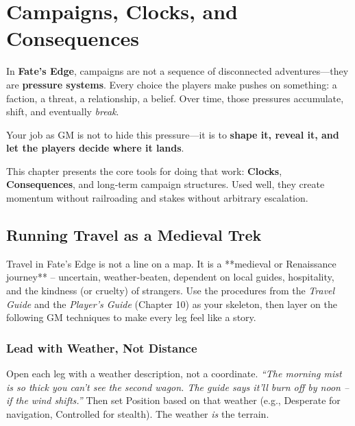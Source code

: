 \chapter{Campaigns, Clocks, and Consequences}
\label{ch:campaigns-clocks}

In \textbf{Fate's Edge}, campaigns are not a sequence of disconnected adventures—they are \textbf{pressure systems}.  
Every choice the players make pushes on something: a faction, a threat, a relationship, a belief. Over time, those pressures accumulate, shift, and eventually \emph{break}.

Your job as GM is not to hide this pressure—it is to \textbf{shape it, reveal it, and let the players decide where it lands}.

This chapter presents the core tools for doing that work: \textbf{Clocks}, \textbf{Consequences}, and long‑term campaign structures. Used well, they create momentum without railroading and stakes without arbitrary escalation.

\section{Running Travel as a Medieval Trek}
\label{sec:gm-travel}

Travel in Fate’s Edge is not a line on a map. It is a **medieval or Renaissance journey** – uncertain, weather‑beaten, dependent on local guides, hospitality, and the kindness (or cruelty) of strangers. Use the procedures from the \textit{Travel Guide} and the \textit{Player’s Guide} (Chapter 10) as your skeleton, then layer on the following GM techniques to make every leg feel like a story.

\subsection{Lead with Weather, Not Distance}
Open each leg with a weather description, not a coordinate.  
\textit{“The morning mist is so thick you can’t see the second wagon. The guide says it’ll burn off by noon – if the wind shifts.”}  
Then set Position based on that weather (e.g., Desperate for navigation, Controlled for stealth). The weather \emph{is} the terrain.

